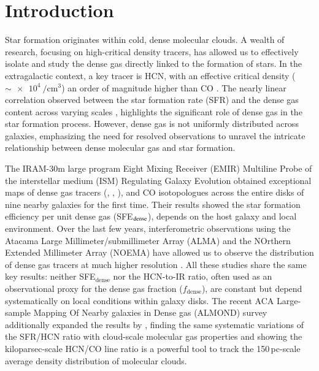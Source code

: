 \documentclass[letter, longauth]{aa} %
\begin{document}

   \maketitle
%

\section{Introduction}

Star formation originates within cold, dense molecular clouds. 
A wealth of research, focusing on high-critical density tracers, has allowed us to effectively isolate and study the dense gas directly linked to the formation of stars. 
In the extragalactic context, a key tracer is HCN, with an effective critical density ($\sim\SI{e4}{\per\cubic\cm}$) an order of magnitude higher than CO \citep[$\sim\SI{e3}{\per\cubic\cm}$,][]{Shirley2015}. 
The nearly linear correlation observed between the star formation rate (SFR) and the dense gas content across varying scales \citep[e.g.,][]{Gao2004, Wu2010, Usero2015, Chen2017}, highlights the significant role of dense gas in the star formation process. 
However, dense gas is not uniformly distributed across galaxies, emphasizing the need for resolved observations to unravel the intricate relationship between dense molecular gas and star formation.

The IRAM-30m large program Eight Mixing Receiver (EMIR) Multiline Probe of the interstellar medium (ISM) Regulating Galaxy Evolution \citep[EMPIRE;][]{Bigiel2016, Jimenez-Donaire2017, Jimenez-Donaire2019} obtained exceptional maps of dense gas tracers (\hcnone, \hcopone, \hncone), and CO isotopologues across the entire disks of nine nearby galaxies for the first time. 
Their results showed the star formation efficiency per unit dense gas (SFE$_{\rm dense}$), depends on the host galaxy and local environment. 
Over the last few years, interferometric observations using the Atacama Large Millimeter/submillimeter Array (ALMA) and the NOrthern Extended Millimeter Array (NOEMA) have allowed us to observe the distribution of dense gas tracers at much higher resolution \citep[e.g.,][]{Gallagher2018a, Gallagher2018b, Querejeta2019, Beslic2021, Neumann2023a}. 
All these studies share the same key results: neither SFE$_\mathrm{dense}$ nor the HCN-to-IR ratio, often used as an observational proxy for the dense gas fraction ($f_\mathrm{dense}$), are constant but depend systematically on local conditions within galaxy disks. 
The recent ACA Large-sample Mapping Of Nearby galaxies in Dense gas (ALMOND) survey \citep{Neumann2023a} additionally expanded the results by \citet{Gallagher2018b}, finding the same systematic variations of the SFR/HCN ratio with cloud-scale molecular gas properties and showing the kiloparsec-scale HCN/CO line ratio is a powerful tool to track the 150\,pc-scale average density distribution of molecular clouds.
\end{document}
